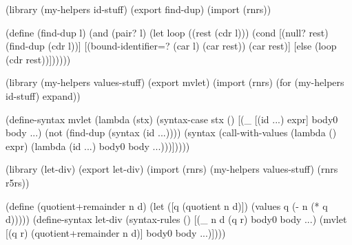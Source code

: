 {%
\renewcommand{\baselinestretch}{1.04}
\selectfont
\begin{schemenoindent}
(library (my-helpers id-stuff)
  (export find-dup)
  (import (rnrs))

  (define (find-dup l)
    (and (pair? l)
         (let loop ((rest (cdr l)))
           (cond
            [(null? rest) (find-dup (cdr l))]
            [(bound-identifier=? (car l) (car rest))
             (car rest)]
            [else (loop (cdr rest))])))))

(library (my-helpers values-stuff)
  (export mvlet)
  (import (rnrs) (for (my-helpers id-stuff) expand))

  (define-syntax mvlet
    (lambda (stx)
      (syntax-case stx ()
        [(\_ [(id ...) expr] body0 body ...)
         (not (find-dup (syntax (id ...))))
         (syntax
           (call-with-values
               (lambda () expr)
             (lambda (id ...) body0 body ...)))]))))

(library (let-div)
  (export let-div)
  (import (rnrs)
          (my-helpers values-stuff)
          (rnrs r5rs))

  (define (quotient+remainder n d)
    (let ([q (quotient n d)])
      (values q (- n (* q d)))))
  (define-syntax let-div
    (syntax-rules ()
     [(\_ n d (q r) body0 body ...)
      (mvlet [(q r) (quotient+remainder n d)]
        body0 body ...)])))%
\end{schemenoindent}

}


